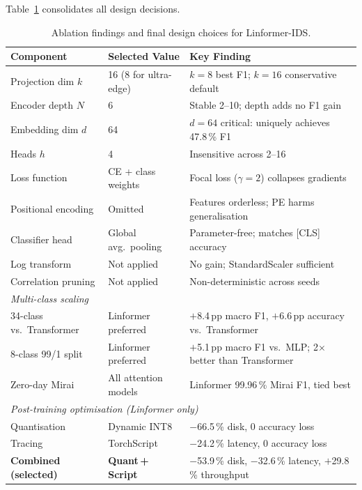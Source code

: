 Table~\ref{tab:ablation_summary} consolidates all design decisions.

\begin{table}[h]
\centering
\caption{Ablation findings and final design choices for Linformer-IDS.}
\label{tab:ablation_summary}
\begin{tabular}{p{3.2cm}p{2.8cm}p{4.7cm}}
\toprule
\textbf{Component} & \textbf{Selected Value} & \textbf{Key Finding} \\
\midrule
Projection dim $k$       & 16 (8 for ultra-edge) & $k=8$ best F1; $k=16$ conservative default \\
Encoder depth $N$        & 6                     & Stable 2--10; depth adds no F1 gain \\
Embedding dim $d$        & 64                    & $d=64$ critical: uniquely achieves 47.8\,\% F1 \\
Heads $h$                & 4                     & Insensitive across 2--16 \\
Loss function            & CE + class weights    & Focal loss ($\gamma=2$) collapses gradients \\
Positional encoding      & Omitted               & Features orderless; PE harms generalisation \\
Classifier head          & Global avg.\ pooling  & Parameter-free; matches [CLS] accuracy \\
Log transform            & Not applied           & No gain; StandardScaler sufficient \\
Correlation pruning      & Not applied           & Non-deterministic across seeds \\
\midrule
\multicolumn{3}{l}{\textit{Multi-class scaling}} \\
34-class vs.\ Transformer & Linformer preferred  & $+$8.4\,pp macro F1, $+$6.6\,pp accuracy vs.\ Transformer \\
8-class 99/1 split        & Linformer preferred  & $+$5.1\,pp macro F1 vs.\ MLP; 2$\times$ better than Transformer \\
Zero-day Mirai            & All attention models & Linformer 99.96\,\% Mirai F1, tied best \\
\midrule
\multicolumn{3}{l}{\textit{Post-training optimisation (Linformer only)}} \\
Quantisation             & Dynamic INT8          & $-$66.5\,\% disk, 0 accuracy loss \\
Tracing                  & TorchScript           & $-$24.2\,\% latency, 0 accuracy loss \\
\textbf{Combined (selected)} & \textbf{Quant\,+\,Script} & $-$53.9\,\% disk, $-$32.6\,\% latency, $+$29.8\,\% throughput \\
\bottomrule
\end{tabular}
\end{table}

